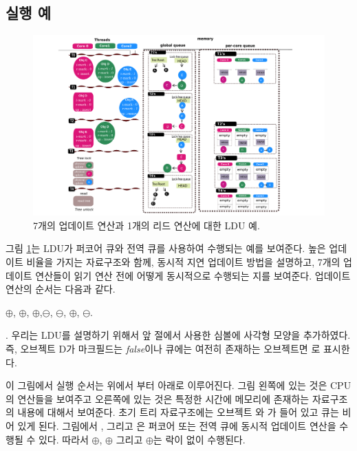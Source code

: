 \subsection{실행 예}
\begin{figure}[h!]
  \begin{center}
     \includegraphics[width=1.0\textwidth,height=0.4\textheight]{fig/basic_gldu}
  \end{center}
  \caption{7개의 업데이트 연산과 1개의 리드 연산에 대한 LDU 예.}
  \label{fig:basic}
\end{figure}


그림 \ref{fig:basic}는 LDU가 퍼코어 큐와 전역 큐를 사용하여 수행되는 예를 보여준다.
높은 업데이트 비율을 가지는 자료구조와 함께, 동시적 지연 업데이트 방법을 설명하고, 
7개의 업데이트 연산들이 읽기 연산 전에 어떻게 동시적으로
수행되는 지를 보여준다.
업데이트 연산의 순서는 다음과 같다. 
\begin{center}
$\oplus$, $\oplus$, $\oplus$,$\ominus$,
$\ominus$, $\oplus$, $\ominus$. 
\end{center}.
우리는 LDU를 설명하기 위해서 앞 절에서 사용한 심볼에 사각형 모양을 추가하였다. 
즉, 오브젝트 D가 마크필드는 \textit{false}이나 큐에는 여전히 존재하는 오브젝트면 로 표시한다.

이 그림에서 실행 순서는 위에서 부터 아래로 이루어진다.
그림 왼쪽에 있는 것은 CPU의 연산들을 보여주고 오른쪽에 있는 것은 특정한 시간에 메모리에 존재하는 
자료구조의 내용에 대해서 보여준다. 
초기 트리 자료구조에는 오브젝트 와 가 들어 있고 큐는 비어 있게 된다.
그림에서 ,  그리고 은 
퍼코어 또는 전역 큐에 동시적 업데이트 연산을 수행될 수 있다.
따라서 $\oplus$, $\oplus$ 그리고 $\oplus$는 락이 없이 수행된다.

